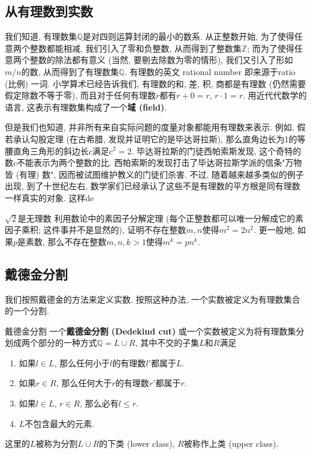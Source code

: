 
\subsection{从有理数到实数}

我们知道, 有理数集$\mathbb{Q}$是对四则运算封闭的最小的数系. 从正整数开始, 为了使得任意两个整数都能相减, 我们引入了零和负整数, 从而得到了整数集$\mathbb{Z}$; 而为了使得任意两个整数的除法都有意义 (当然, 要剔去除数为零的情形), 我们又引入了形如$m/n$的数, 从而得到了有理数集$\mathbb{Q}$. 有理数的英文 rational number 即来源于ratio (比例) 一词. 小学算术已经告诉我们, 有理数的和, 差, 积, 商都是有理数 (仍然需要假定除数不等于零), 而且对于任何有理数$r$都有$r+0=r$, $r\cdot1=r$. 用近代代数学的语言, 这表示有理数集构成了一个\textbf{域 (field)}.

但是我们也知道, 并非所有来自实际问题的度量对象都能用有理数来表示. 例如, 假若承认勾股定理 (在古希腊, 发现并证明它的是毕达哥拉斯), 那么直角边长为1的等腰直角三角形的斜边长$c$满足$c^2=2$. 毕达哥拉斯的门徒西帕索斯发现, 这个奇特的数$c$不能表示为两个整数的比. 西帕索斯的发现打击了毕达哥拉斯学派的信条"万物皆 (有理) 数", 因而被试图维护教义的门徒们杀害. 不过, 随着越来越多类似的例子出现, 到了十世纪左右, 数学家们已经承认了这些不是有理数的平方根是同有理数一样真实的对象. 这样de

\begin{exercise}{$\sqrt{2}$是无理数}
利用数论中的素因子分解定理 (每个正整数都可以唯一分解成它的素因子乘积; 这件事并不是显然的), 证明不存在整数$m,n$使得$m^2=2n^2$. 更一般地, 如果$p$是素数, 那么不存在整数$m,n,k>1$使得$m^k=pn^k$.
\end{exercise}



\subsection{戴德金分割}
我们按照戴德金的方法来定义实数. 按照这种办法, 一个实数被定义为有理数集合的一个分割.

\begin{definition}{戴德金分割}
一个\textbf{戴德金分割 (Dedekind cut)} 或一个实数被定义为将有理数集分划成两个部分的一种方式$\mathbb{Q}=L\cup R$, 其中不交的子集$L$和$R$满足

\begin{enumerate}
\item 如果$l\in L$, 那么任何小于$l$的有理数$l'$都属于$L$.
\item 如果$r\in R$, 那么任何大于$r$的有理数$r'$都属于$r$.
\item 如果$l\in L$, $r\in R$, 那么必有$l\leq r$.
\item $L$不包含最大的元素.
\end{enumerate}

这里的$L$被称为分割$L\cup R$的下类 (lower class), $R$被称作上类 (upper class).
\end{definition}

